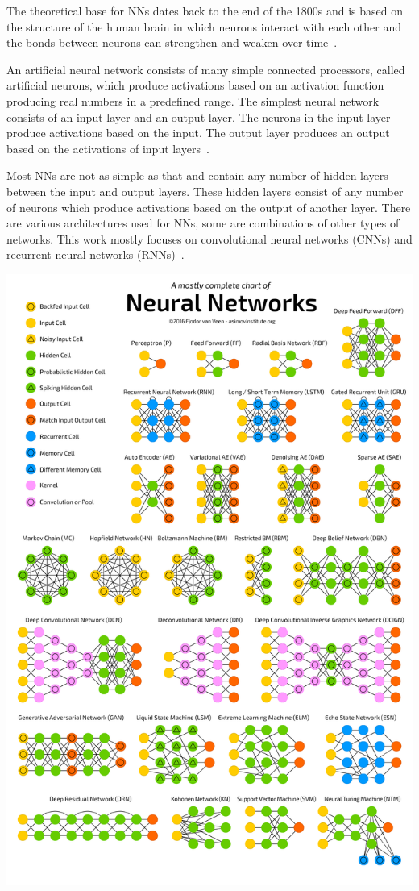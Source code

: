 \documentclass[12pt]{article}
\begin{document}
The theoretical base for NNs dates back to the end of the 1800s and is based on the structure of the human brain in which neurons interact with each other and the bonds between neurons can strengthen and weaken over time~\cite{SCHMIDHUBER201585}.

An artificial neural network consists of many simple connected processors, called artificial neurons, which produce activations based on an activation function producing real numbers in a predefined range. The simplest neural network consists of an input layer and an output layer. The neurons in the input layer produce activations based on the input. The output layer produces an output based on the activations of input layers~\cite{SCHMIDHUBER201585}.

Most NNs are not as simple as that and contain any number of hidden layers between the input and output layers. These hidden layers consist of any number of neurons which produce activations based on the output of another layer. There are various architectures used for NNs, some are combinations of other types of networks. This work mostly focuses on convolutional neural networks (CNNs) and recurrent neural networks (RNNs)~\cite{SCHMIDHUBER201585}.

\includegraphics [width=\textwidth, height=\textheight, keepaspectratio] {neuralnetworks.png}~\cite{netzoo}
\end{document}
